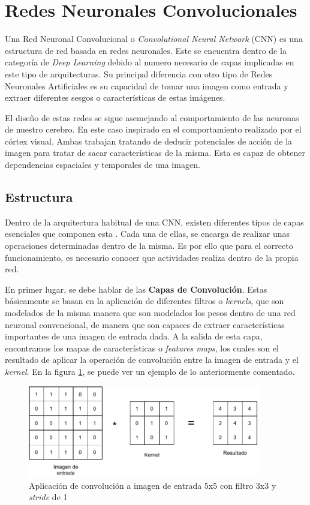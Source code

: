 \section{Redes Neuronales Convolucionales}

Una Red Neuronal Convolucional o \textit{Convolutional Neural Network} (CNN) es una estructura de red basada en redes neuronales. Este se encuentra dentro de la categoría de \textit{Deep Learning} debido al numero necesario de capas implicadas en este tipo de arquitecturas. Su principal diferencia con otro tipo de Redes Neuronales Artificiales es su capacidad de tomar una imagen como entrada y extraer diferentes sesgos o características de estas imágenes.

El diseño de estas redes se sigue asemejando al comportamiento de las neuronas de nuestro cerebro. En este caso inspirado en el comportamiento realizado por el córtex visual. Ambas trabajan tratando de deducir potenciales de acción de la imagen para tratar de sacar características de la misma. Esta es capaz de obtener dependencias espaciales y temporales de una imagen.

\subsection{Estructura}

Dentro de la arquitectura habitual de una CNN, existen diferentes tipos de capas esenciales que componen esta \cite{Aggarwal2018}. Cada una de ellas, se encarga de realizar unas operaciones determinadas dentro de la misma. Es por ello que para el correcto funcionamiento, es necesario conocer que actividades realiza dentro de la propia red.

En primer lugar, se debe hablar de las \textbf{Capas de Convolución}. Estas básicamente se basan en la aplicación de diferentes filtros o \textit{kernels}, que son modelados de la misma manera que son modelados los pesos dentro de una red neuronal convencional, de manera que son capaces de extraer características importantes de una imagen de entrada dada. A la salida de esta capa, encontramos los mapas de características o \textit{features maps}, los cuales son el resultado de aplicar la operación de convolución entre la imagen de entrada y el \textit{kernel}. En la figura \ref{fig:convolucion}, se puede ver un ejemplo de lo anteriormente comentado.\\

\begin{figure}[!h]
\centering
\includegraphics[width=0.9\textwidth]{figuras/desarrollo teorico/Convolucion.pdf}
\caption{Aplicación de convolución a imagen de entrada 5x5 con filtro 3x3 y \textit{stride} de 1}
\label{fig:convolucion}
\end{figure}

